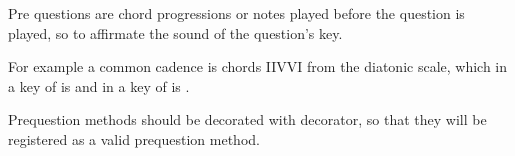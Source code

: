 \documentclass[letterpaper,10pt,english]{sphinxmanual}
\begin{document}
\sphinxAtStartPar
Pre questions are chord progressions or notes played before the question is
played, so to affirmate the sound of the question’s key.

\sphinxAtStartPar
For example a common cadence is chords I\sphinxhyphen{}IV\sphinxhyphen{}V\sphinxhyphen{}I from the diatonic scale, which
in a key of  is  and in a key of  is .

\sphinxAtStartPar
Pre\sphinxhyphen{}question methods should be decorated with 
decorator, so that they will be registered as a valid pre\sphinxhyphen{}question method.
\end{document}
